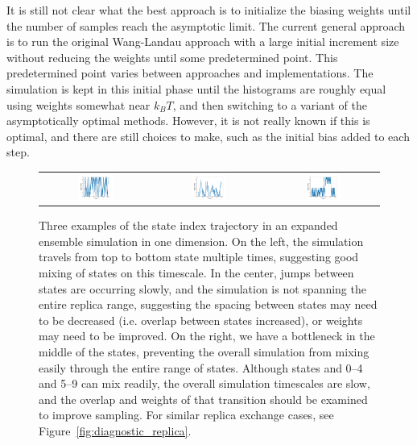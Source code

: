 \documentclass[9pt,review]{livecoms}
\begin{document}
It is still not clear what the best approach is to initialize the biasing weights until the number of samples reach the asymptotic limit.  The current general approach is to run the original Wang-Landau approach with a large initial increment size without reducing the weights until some predetermined point. This predetermined point varies between approaches and implementations.  The simulation is kept in this initial phase until the histograms are roughly equal using weights somewhat near $k_BT$, and then switching to a variant of the asymptotically optimal methods. However, it is not really known if this is optimal, and there are still choices to make, such as the initial bias added to each step.


\begin{figure}[!ht]
    \centering
\begin{tabular}{c|c|c}
\includegraphics[width=0.33\textwidth]{Figures/diagnostic_figures/goodmixing_exp.png} & \includegraphics[width=0.33\textwidth]{Figures/diagnostic_figures/slowmixing_exp.png}&
\includegraphics[width=0.33\textwidth]{Figures/diagnostic_figures/sepmixing_exp.png}
\end{tabular}
    \caption{Three examples of the state index trajectory in an expanded ensemble simulation in one dimension. On the left, the simulation travels from top to bottom state multiple times, suggesting good mixing of states on this timescale.  In the center, jumps between states are occurring slowly, and the simulation is not spanning the entire replica range, suggesting the spacing between states may need to be decreased (i.e. overlap between states increased), or weights may need to be improved. On the right, we have a bottleneck in the middle of the states, preventing the overall simulation from mixing easily through the entire range of states. Although states and 0--4 and 5--9 can mix readily, the overall simulation timescales are slow, and the overlap and weights of that transition should be examined to improve sampling. For similar  replica exchange cases, see Figure~\ref{fig:diagnostic_replica}.}
    \label{fig:diagnostic_expanded}
\end{figure}
\end{document}

